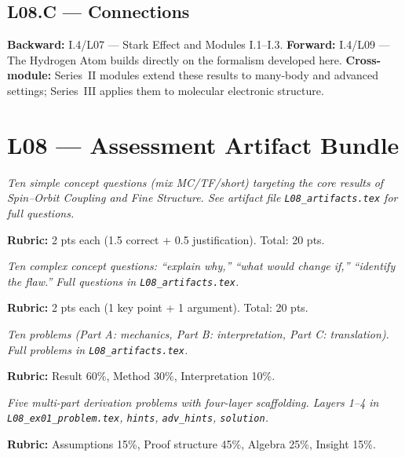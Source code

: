 \subsection*{L08.C — Connections}
\label{sec:L08.C}
\textbf{Backward:} I.4/L07 — Stark Effect and Modules I.1–I.3.
\textbf{Forward:} I.4/L09 — The Hydrogen Atom builds directly on the formalism developed here.
\textbf{Cross-module:} Series~II modules extend these results to many-body and
advanced settings; Series~III applies them to molecular electronic structure.

\newpage
\section*{L08 — Assessment Artifact Bundle}

\begin{tcolorbox}[ugconceptbox, title={SCQU · L08 · Tiers 1–3 · 15–20 min}]
\textit{Ten simple concept questions (mix MC/TF/short) targeting the core results
of Spin–Orbit Coupling and Fine Structure. See artifact file \texttt{L08_artifacts.tex} for full questions.}

\textbf{Rubric:} 2 pts each (1.5 correct + 0.5 justification). Total: 20 pts.
\end{tcolorbox}

\begin{tcolorbox}[ugconceptbox, title={CCQU · L08 · Tiers 2–3 · 25–35 min}]
\textit{Ten complex concept questions: ``explain why,'' ``what would change if,''
``identify the flaw.'' Full questions in \texttt{L08_artifacts.tex}.}

\textbf{Rubric:} 2 pts each (1 key point + 1 argument). Total: 20 pts.
\end{tcolorbox}

\begin{tcolorbox}[ugprobbox, title={SPSU · L08 · Tiers 1–3 · 60–90 min}]
\textit{Ten problems (Part A: mechanics, Part B: interpretation, Part C: translation).
Full problems in \texttt{L08_artifacts.tex}.}

\textbf{Rubric:} Result 60\%, Method 30\%, Interpretation 10\%.
\end{tcolorbox}

\begin{tcolorbox}[ugprobbox, title={CPSU · L08 · Tier 3 · 3–6 hrs (4-layer)}]
\textit{Five multi-part derivation problems with four-layer scaffolding.
Layers 1–4 in \texttt{L08_ex01\_problem.tex}, \texttt{hints}, \texttt{adv\_hints}, \texttt{solution}.}

\textbf{Rubric:} Assumptions 15\%, Proof structure 45\%, Algebra 25\%, Insight 15\%.
\end{tcolorbox}

